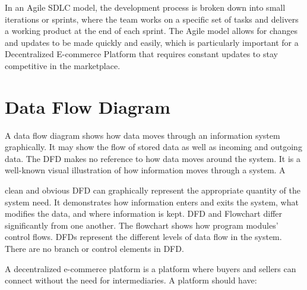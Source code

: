 \documentclass{report}
\begin{document}
In an Agile SDLC model, the development process is broken down into small iterations or sprints, where the team works on a specific set of tasks and delivers a working product at the end of each sprint. The Agile model allows for changes and updates to be made quickly and easily, which is particularly important for a Decentralized E-commerce Platform that requires constant updates to stay competitive in the marketplace.\\

\newpage
 \section{Data Flow Diagram}

A data flow diagram shows how data moves through an information system graphically. It may show the flow of stored data as well as incoming and outgoing data. The DFD makes no reference to how data moves around the system. It is a well-known visual illustration of how information moves through a system. A

clean and obvious DFD can graphically represent the appropriate quantity of the system need. It demonstrates how information enters and exits the system, what modifies the data, and where information is kept.
DFD and Flowchart differ significantly from one another. The flowchart shows how program modules' control flows. DFDs represent the different levels of data flow in the system. There are no branch or control elements in DFD.
 
 A decentralized e-commerce platform is a platform where buyers and sellers can connect without the need for intermediaries. A platform should have:
\end{document}
